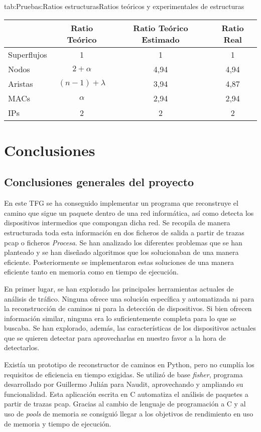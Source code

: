 \documentclass[tfg,epsbased,lof,lot,loa,final,nocopyright,overleaf]{tfgtfmthesisuam}
\begin{document}
\begin{table}{tab:Pruebas:Ratios estructuras}{Ratios teóricos y experimentales de estructuras}
	\begin{tabular}{lccc}
		\toprule & \textbf{Ratio Teórico}  & \textbf{Ratio Teórico Estimado} & \textbf{Ratio Real} \\ 
		\midrule
		Superflujos & 1 & 1 & 1 \\
		Nodos & $2+\alpha$ & 4,94 & 4,94 \\
		Aristas & $(n-1)+\lambda$ & 3,94 & 4,87 \\
		MACs & $\alpha$ & 2,94 & 2,94 \\
		IPs & 2 & 2 & 2 \\ 
		\bottomrule
	\end{tabular}
\end{table}

\chapter{Conclusiones}
\label{chap:Conclusiones}

\section{Conclusiones generales del proyecto}

En este TFG se ha conseguido implementar un programa que reconstruye el camino que sigue un paquete dentro de una red informática, así como detecta los dispositivos intermedios que compongan dicha red. Se recopila de manera estructurada toda esta información en dos ficheros de salida a partir de trazas pcap o ficheros \textit{Procesa}. Se han analizado los diferentes problemas que se han planteado y se han diseñado algoritmos que los solucionaban de una manera eficiente. Posteriormente se implementaron estas soluciones de una manera eficiente tanto en memoria como en tiempo de ejecución.

En primer lugar, se han explorado las principales herramientas actuales de análisis de tráfico. Ninguna ofrece una solución específica y automatizada ni para la reconstrucción de caminos ni para la detección de dispositivos. Si bien ofrecen información similar, ninguna era lo suficientemente completa para lo que se buscaba. Se han explorado, además, las características de los dispositivos actuales que se quieren detectar para aprovecharlas en nuestro favor a la hora de detectarlos.

Existía un prototipo de reconstructor de caminos en Python, pero no cumplía los requisitos de eficiencia en tiempo exigidas. Se utilizó de base \textit{fisher}, programa desarrollado por Guillermo Julián para Naudit, aprovechando y ampliando su funcionalidad. Esta aplicación escrita en C automatiza el análisis de paquetes a partir de trazas pcap. Gracias al cambio de lenguaje de programación a C y al uso de \textit{pools} de memoria se consiguió llegar a los objetivos de rendimiento en uso de memoria y tiempo de ejecución.
\end{document}
